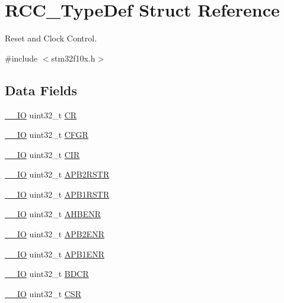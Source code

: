 \hypertarget{struct_r_c_c___type_def}{}\section{R\+C\+C\+\_\+\+Type\+Def Struct Reference}
\label{struct_r_c_c___type_def}


Reset and Clock Control.  




{\ttfamily \#include $<$stm32f10x.\+h$>$}

\subsection*{Data Fields}
\begin{DoxyCompactItemize}
\item 
\mbox{\hyperlink{core__sc300_8h_aec43007d9998a0a0e01faede4133d6be}{\+\_\+\+\_\+\+IO}} uint32\+\_\+t \mbox{\hyperlink{struct_r_c_c___type_def_ab40c89c59391aaa9d9a8ec011dd0907a}{CR}}
\item 
\mbox{\hyperlink{core__sc300_8h_aec43007d9998a0a0e01faede4133d6be}{\+\_\+\+\_\+\+IO}} uint32\+\_\+t \mbox{\hyperlink{struct_r_c_c___type_def_a26f1e746ccbf9c9f67e7c60e61085ec1}{C\+F\+GR}}
\item 
\mbox{\hyperlink{core__sc300_8h_aec43007d9998a0a0e01faede4133d6be}{\+\_\+\+\_\+\+IO}} uint32\+\_\+t \mbox{\hyperlink{struct_r_c_c___type_def_a907d8154c80b7e385478943f90b17a3b}{C\+IR}}
\item 
\mbox{\hyperlink{core__sc300_8h_aec43007d9998a0a0e01faede4133d6be}{\+\_\+\+\_\+\+IO}} uint32\+\_\+t \mbox{\hyperlink{struct_r_c_c___type_def_ab2c5389c9ff4ac188cd498b8f7170968}{A\+P\+B2\+R\+S\+TR}}
\item 
\mbox{\hyperlink{core__sc300_8h_aec43007d9998a0a0e01faede4133d6be}{\+\_\+\+\_\+\+IO}} uint32\+\_\+t \mbox{\hyperlink{struct_r_c_c___type_def_a7da5d372374bc59e9b9af750b01d6a78}{A\+P\+B1\+R\+S\+TR}}
\item 
\mbox{\hyperlink{core__sc300_8h_aec43007d9998a0a0e01faede4133d6be}{\+\_\+\+\_\+\+IO}} uint32\+\_\+t \mbox{\hyperlink{struct_r_c_c___type_def_acdf2b32fb3d8dad6bee74bf4cbe25020}{A\+H\+B\+E\+NR}}
\item 
\mbox{\hyperlink{core__sc300_8h_aec43007d9998a0a0e01faede4133d6be}{\+\_\+\+\_\+\+IO}} uint32\+\_\+t \mbox{\hyperlink{struct_r_c_c___type_def_acc7bb47dddd2d94de124f74886d919be}{A\+P\+B2\+E\+NR}}
\item 
\mbox{\hyperlink{core__sc300_8h_aec43007d9998a0a0e01faede4133d6be}{\+\_\+\+\_\+\+IO}} uint32\+\_\+t \mbox{\hyperlink{struct_r_c_c___type_def_ac88901e2eb35079b7b58a185e6bf554c}{A\+P\+B1\+E\+NR}}
\item 
\mbox{\hyperlink{core__sc300_8h_aec43007d9998a0a0e01faede4133d6be}{\+\_\+\+\_\+\+IO}} uint32\+\_\+t \mbox{\hyperlink{struct_r_c_c___type_def_a0b9a3ced775287c8585a6a61af4b40e9}{B\+D\+CR}}
\item 
\mbox{\hyperlink{core__sc300_8h_aec43007d9998a0a0e01faede4133d6be}{\+\_\+\+\_\+\+IO}} uint32\+\_\+t \mbox{\hyperlink{struct_r_c_c___type_def_a876dd0a8546697065f406b7543e27af2}{C\+SR}}
\end{DoxyCompactItemize}


